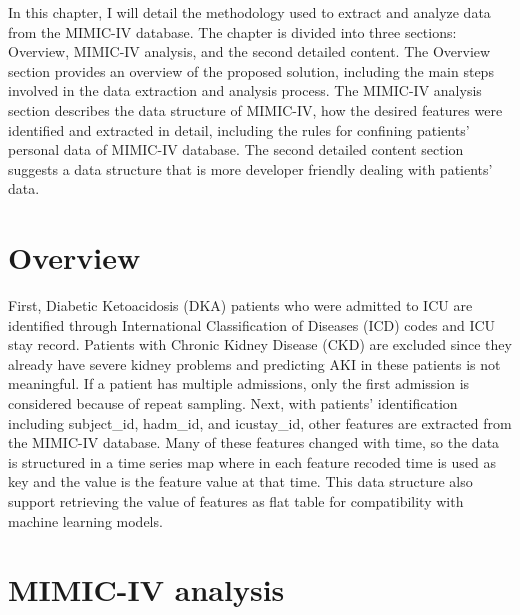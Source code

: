 \documentclass[../main.tex]{subfiles}
\begin{document}
In this chapter, I will detail the methodology used to extract and analyze data from the MIMIC-IV database.
The chapter is divided into three sections: Overview, MIMIC-IV analysis, and the second detailed content.
The Overview section provides an overview of the proposed solution, including the main steps involved in the data extraction and analysis process.
The MIMIC-IV analysis section describes the data structure of MIMIC-IV, how the desired features were identified and  extracted in detail, including the rules for confining patients' personal data of MIMIC-IV database.
The second detailed content section suggests a data structure that is more developer friendly dealing with patients' data.


\section{Overview}

First, Diabetic Ketoacidosis (DKA) patients who were admitted to ICU are identified through International Classification of Diseases (ICD) codes and ICU stay record.
Patients with Chronic Kidney Disease (CKD) are excluded since they already have severe kidney problems and predicting AKI in these patients is not meaningful.
If a patient has multiple admissions, only the first admission is considered because of repeat sampling.
Next, with patients' identification including subject\_id, hadm\_id, and icustay\_id, other features are extracted from the MIMIC-IV database.
Many of these features changed with time, so the data is structured in a time series map where in each feature recoded time is used as key and the value is the feature value at that time.
This data structure also support retrieving the value of features as flat table for compatibility with machine learning models.



\section{MIMIC-IV analysis}
\end{document}
